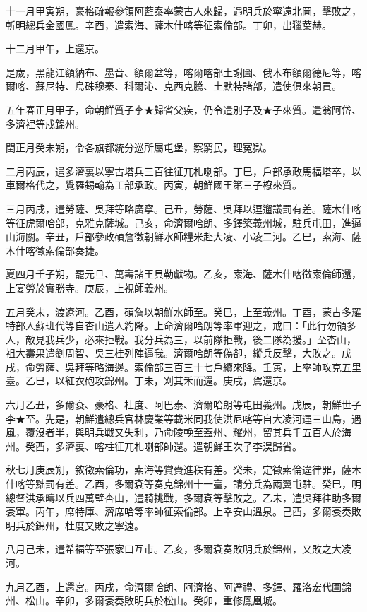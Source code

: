 \begin{pinyinscope}
十一月甲寅朔，豪格疏報參領阿藍泰率蒙古人來歸，遇明兵於寧遠北岡，擊敗之，斬明總兵金國鳳。辛酉，遣索海、薩木什喀等征索倫部。丁卯，出獵葉赫。

十二月甲午，上還京。

是歲，黑龍江額納布、墨音、額爾盆等，喀爾喀部土謝圖、俄木布額爾德尼等，喀爾喀、蘇尼特、烏硃穆秦、科爾沁、克西克騰、土默特諸部，遣使俱來朝貢。

五年春正月甲子，命朝鮮質子李★歸省父疾，仍令遣別子及★子來質。遣翁阿岱、多濟裡等戍錦州。

閏正月癸未朔，令各旗都統分巡所屬屯堡，察窮民，理冤獄。

二月丙辰，遣多濟裏以寧古塔兵三百往征兀札喇部。丁巳，戶部承政馬福塔卒，以車爾格代之，覺羅錫翰為工部承政。丙寅，朝鮮國王第三子橑來質。

三月丙戌，遣勞薩、吳拜等略廣寧。己丑，勞薩、吳拜以逗遛議罰有差。薩木什喀等征虎爾哈部，克雅克薩城。己亥，命濟爾哈朗、多鐸築義州城，駐兵屯田，進逼山海關。辛丑，戶部參政碩詹徵朝鮮水師糧米赴大凌、小凌二河。乙巳，索海、薩木什喀徵索倫部奏捷。

夏四月壬子朔，罷元旦、萬壽諸王貝勒獻物。乙亥，索海、薩木什喀徵索倫師還，上宴勞於實勝寺。庚辰，上視師義州。

五月癸未，渡遼河。乙酉，碩詹以朝鮮水師至。癸巳，上至義州。丁酉，蒙古多羅特部人蘇班代等自杏山遣人約降。上命濟爾哈朗等率軍迎之，戒曰：「此行勿領多人，敵見我兵少，必來拒戰。我分兵為三，以前隊拒戰，後二隊為援。」至杏山，祖大壽果遣劉周智、吳三桂列陣逼我。濟爾哈朗等偽卻，縱兵反擊，大敗之。戊戌，命勞薩、吳拜等略海邊。索倫部三百三十七戶續來降。壬寅，上率師攻克五里臺。乙巳，以紅衣砲攻錦州。丁未，刈其禾而還。庚戌，駕還京。

六月乙丑，多爾袞、豪格、杜度、阿巴泰、濟爾哈朗等屯田義州。戊辰，朝鮮世子李★至。先是，朝鮮遣總兵官林慶業等載米同我使洪尼喀等自大凌河運三山島，遇風，覆沒者半，與明兵戰又失利，乃命陵輓至蓋州、耀州，留其兵千五百人於海州。癸酉，多濟裏、喀柱征兀札喇部師還。遣朝鮮王次子李淏歸省。

秋七月庚辰朔，敘徵索倫功，索海等賞賚進秩有差。癸未，定徵索倫違律罪，薩木什喀等黜罰有差。乙酉，多爾袞等奏克錦州十一臺，請分兵為兩翼屯駐。癸巳，明總督洪承疇以兵四萬壁杏山，遣騎挑戰，多爾袞等擊敗之。乙未，遣吳拜往助多爾袞軍。丙午，席特庫、濟席哈等率師征索倫部。上幸安山溫泉。己酉，多爾袞奏敗明兵於錦州，杜度又敗之寧遠。

八月己未，遣希福等至張家口互市。乙亥，多爾袞奏敗明兵於錦州，又敗之大凌河。

九月乙酉，上還宮。丙戌，命濟爾哈朗、阿濟格、阿達禮、多鐸、羅洛宏代圍錦州、松山。辛卯，多爾袞奏敗明兵於松山。癸卯，重修鳳凰城。


\end{pinyinscope}

